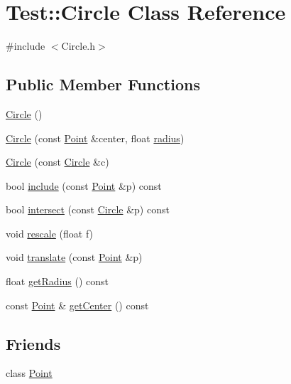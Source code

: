\hypertarget{class_test_1_1_circle}{\section{Test\+:\+:Circle Class Reference}
\label{class_test_1_1_circle}
}


{\ttfamily \#include $<$Circle.\+h$>$}

\subsection*{Public Member Functions}
\begin{DoxyCompactItemize}
\item 
\hyperlink{class_test_1_1_circle_ae89b3566c2389f77a31a3d72bfe20249}{Circle} ()
\item 
\hyperlink{class_test_1_1_circle_a53d72787d12ad1530d3009f41058b8f7}{Circle} (const \hyperlink{class_test_1_1_point}{Point} \&center, float \hyperlink{_examples_2_planet_2_app_8cpp_a5050a760c11da521cd4aee6336f6529f}{radius})
\item 
\hyperlink{class_test_1_1_circle_aa860ba30c230945566e7fc1693be1a48}{Circle} (const \hyperlink{class_test_1_1_circle}{Circle} \&c)
\item 
bool \hyperlink{class_test_1_1_circle_a0e7a70d252b6cca56c7848fa920a1eaf}{include} (const \hyperlink{class_test_1_1_point}{Point} \&p) const 
\item 
bool \hyperlink{class_test_1_1_circle_acefe8f9ca1a4b9dba7c5d7a19374dd0a}{intersect} (const \hyperlink{class_test_1_1_circle}{Circle} \&p) const 
\item 
void \hyperlink{class_test_1_1_circle_a1a2ca91188c648511be9bd648186bfc6}{rescale} (float f)
\item 
void \hyperlink{class_test_1_1_circle_a226ffb91bc3757e568d6bc225870029b}{translate} (const \hyperlink{class_test_1_1_point}{Point} \&p)
\item 
float \hyperlink{class_test_1_1_circle_a9329a2de32fac630c608299c90d363c7}{get\+Radius} () const 
\item 
const \hyperlink{class_test_1_1_point}{Point} \& \hyperlink{class_test_1_1_circle_a4b33de089a4eb7dc92b7fe0a871a59ca}{get\+Center} () const 
\end{DoxyCompactItemize}
\subsection*{Friends}
\begin{DoxyCompactItemize}
\item 
class \hyperlink{class_test_1_1_circle_aa238d52f825b8ea8da6a5c4ae1b8d482}{Point}
\end{DoxyCompactItemize}


